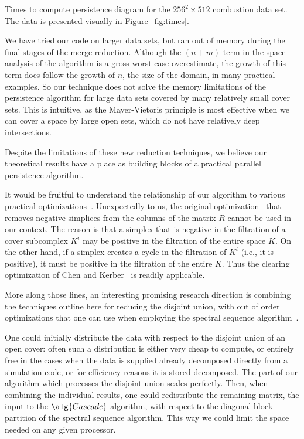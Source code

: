 \begin{table}
    \centering
    \pgfplotstabletypeset
    [
        every head row/.style={
            before row={
                \toprule
            },
            after row=\midrule,
        },
        columns={proc, time},
        columns/proc/.style         ={column name=processors, int detect, column type={r}},
        columns/time/.style         ={column name=seconds, fixed, column type={|r}},
    ]
    {\pltCombustionMed}
    \caption{Times to compute persistence diagram for the $256^2 \times 512$
             combustion data set. The data is presented visually in
             Figure~\ref{fig:times}.}
    \label{tbl:times}
\end{table}

We have tried our code on larger data sets, but ran out of memory during the
final stages of the merge reduction. Although the $(n+m)$ term in the space analysis of the
 algorithm is a gross worst-case overestimate, the growth of this
term does follow the growth of $n$, the size of the domain, in many practical
examples. So our technique does not solve the memory limitations of the
persistence algorithm for large data sets covered by many relatively small cover sets. This is
intuitive, as the Mayer-Vietoris principle is most effective when we can cover a space by large open sets, which do not
have relatively deep intersections. 

Despite the limitations of these new reduction techniques, we believe our theoretical
results have a place as building blocks of a practical parallel persistence algorithm.

It would be fruitful to understand the relationship of our algorithm
to various practical optimizations~\cite{bkr-cccph-13}. 
Unexpectedly to us, the original optimization~\cite{elz-tps-02} that removes negative
simplices from the columns of the matrix $R$ cannot be used in our context.
The reason is that a simplex that is
negative in the filtration of a cover subcomplex $K^i$ may be positive in the
filtration of the entire space $K$.
On the other hand, if a simplex creates a cycle in the filtration of $K^i$
(i.e., it is positive), it must be positive in the filtration of the entire $K$.
Thus the clearing optimization of Chen and Kerber~\cite{bkr-cccph-13}
is readily applicable.

More along those lines, an interesting promising research direction is
combining the techniques outline here for reducing the disjoint union, with out of order optimizations that one can use when
employing the spectral sequence algorithm~\cite{bkr-cccph-13}.

One could initially distribute the data with respect to the disjoint union of an open cover:
often such a distribution is either very cheap to compute, or entirely
free in the cases when the data is supplied already decomposed directly from a simulation code,
or for efficiency reasons it is stored decomposed. The part of our algorithm which processes
the disjoint union scales perfectly. Then, when combining the individual results, one
could redistribute the remaining matrix, the input to the $\alg{Cascade}$
algorithm, with respect to the diagonal block partition of the spectral sequence
algorithm. This way we could limit the space needed on any given processor.
